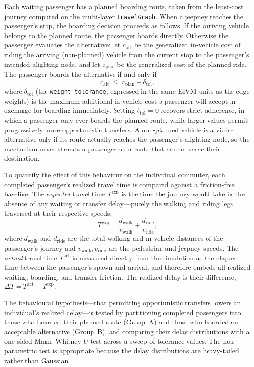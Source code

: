 {{Each waiting passenger has a planned boarding route, taken from the least-cost journey computed on the multi-layer \texttt{TravelGraph}. When a jeepney reaches the passenger's stop, the boarding decision proceeds as follows. If the arriving vehicle belongs to the planned route, the passenger boards directly. Otherwise the passenger evaluates the alternative: let $c_{\text{alt}}$ be the generalized in-vehicle cost of riding the arriving (non-planned) vehicle from the current stop to the passenger's intended alighting node, and let $c_{\text{plan}}$ be the generalized cost of the planned ride. The passenger boards the alternative if and only if
\[
c_{\text{alt}} \;\le\; c_{\text{plan}} + \delta_{\text{tol}},
\]
where $\delta_{\text{tol}}$ (the \texttt{weight\_tolerance}, expressed in the same \ac{EIVM} units as the edge weights) is the maximum additional in-vehicle cost a passenger will accept in exchange for boarding immediately. Setting $\delta_{\text{tol}} = 0$ recovers strict adherence, in which a passenger only ever boards the planned route, while larger values permit progressively more opportunistic transfers. A non-planned vehicle is a viable alternative only if its route actually reaches the passenger's alighting node, so the mechanism never strands a passenger on a route that cannot serve their destination.

To quantify the effect of this behaviour on the individual commuter, each completed passenger's realized travel time is compared against a friction-free baseline. The \emph{expected} travel time $T^{\text{exp}}$ is the time the journey would take in the absence of any waiting or transfer delay---purely the walking and riding legs traversed at their respective speeds:
\[
T^{\text{exp}} = \frac{d_{\text{walk}}}{v_{\text{walk}}} + \frac{d_{\text{ride}}}{v_{\text{ride}}},
\]
where $d_{\text{walk}}$ and $d_{\text{ride}}$ are the total walking and in-vehicle distances of the passenger's journey and $v_{\text{walk}}, v_{\text{ride}}$ are the pedestrian and jeepney speeds. The \emph{actual} travel time $T^{\text{act}}$ is measured directly from the simulation as the elapsed time between the passenger's spawn and arrival, and therefore embeds all realized waiting, boarding, and transfer friction. The realized delay is their difference, $\Delta T = T^{\text{act}} - T^{\text{exp}}$.

The behavioural hypothesis---that permitting opportunistic transfers lowers an individual's realized delay---is tested by partitioning completed passengers into those who boarded their planned route (Group~A) and those who boarded an acceptable alternative (Group~B), and comparing their delay distributions with a one-sided Mann--Whitney $U$ test across a sweep of tolerance values. The non-parametric test is appropriate because the delay distributions are heavy-tailed rather than Gaussian.

}}
